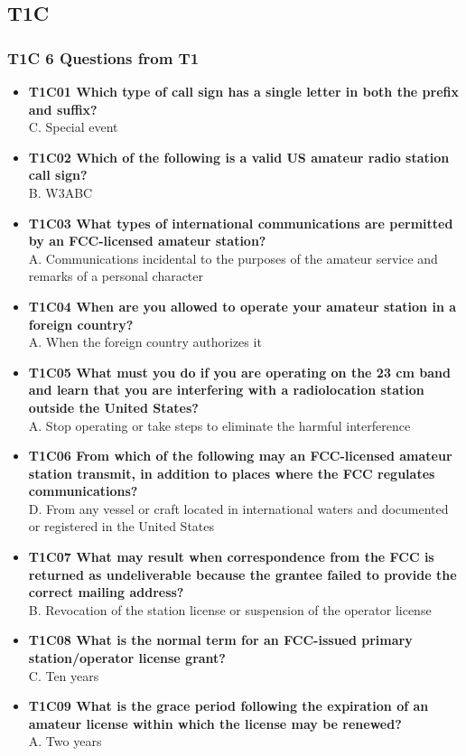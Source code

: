 \documentclass[10pt]{beamer}
\begin{document}
\subsection{T1C}
\begin{frame}
\frametitle{T1C 6 Questions from T1}
\begin{itemize}[<+->]
\tiny
\item\textbf{T1C01 Which type of call sign has a single letter in both the prefix and suffix?}\hfil\\ C. Special event
\item\textbf{T1C02 Which of the following is a valid US amateur radio station call sign?}\hfil\\ B. W3ABC
\item\textbf{T1C03 What types of international communications are permitted by an FCC-licensed amateur station?} \hfil\\A. Communications incidental to the purposes of the amateur service and remarks of a personal character
\item\textbf{T1C04 When are you allowed to operate your amateur station in a foreign country?}\hfil\\ A. When the foreign country authorizes it
\item\textbf{T1C05 What must you do if you are operating on the 23 cm band and learn that you are interfering with a radiolocation  station outside the United States?} \hfil\\A. Stop operating or take steps to eliminate the harmful interference
\item\textbf{T1C06 From which of the following may an FCC-licensed amateur station transmit, in addition to places where the FCC regulates communications?} \hfil\\D. From any vessel or craft located in international waters and documented or registered in the United
States
\item\textbf{T1C07 What may result when correspondence from the FCC is returned as undeliverable because the grantee failed to provide the correct mailing address?} \hfil\\B. Revocation of the station license or suspension of the operator license
\item\textbf{T1C08 What is the normal term for an FCC-issued primary station/operator license grant?}\hfil\\ C. Ten years
\item\textbf{T1C09 What is the grace period following the expiration of an amateur license within which the license may be renewed?} \hfil\\A. Two years

\end{itemize}
\end{frame}
\end{document}
